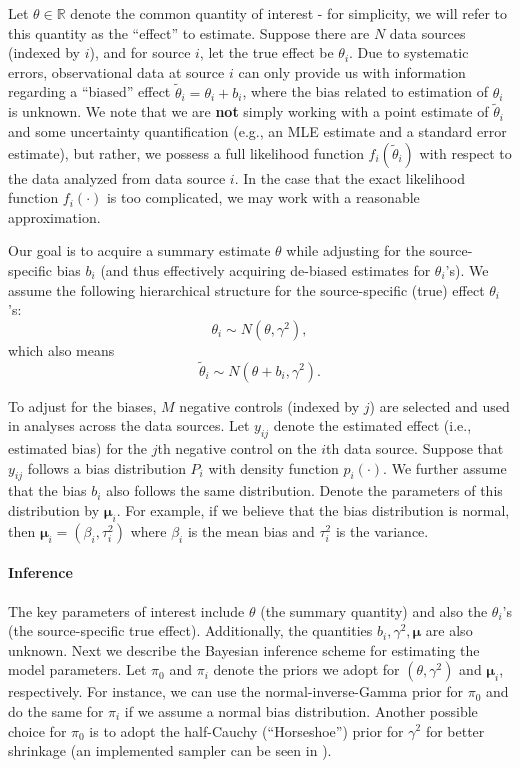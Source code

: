 \documentclass{article}
\begin{document}
Let $\theta \in \mathbb{R}$ denote the common quantity of interest - for simplicity, we will refer to this quantity as the ``effect'' to estimate.
Suppose there are $N$ data sources (indexed by $i$), and for source $i$, let the true effect be $\theta_i$.
Due to systematic errors, observational data at source $i$ can only provide us with information 
regarding a ``biased'' effect $\tilde{\theta}_i = \theta_i + b_i$, where the bias related to estimation of $\theta_i$ is unknown. 
We note that we are \textbf{not} simply working with a point estimate of $\tilde{\theta}_i $ and some uncertainty quantification (e.g., an MLE estimate and a standard error estimate), 
but rather, we possess a full likelihood function $f_i(\tilde{\theta}_i)$ with respect to the data analyzed from data source $i$. 
In the case that the exact likelihood function $f_i(\cdot)$ is too complicated, we may work with a reasonable approximation. 

Our goal is to acquire a summary estimate $\theta$
while adjusting for the source-specific bias $b_i$ (and thus effectively acquiring de-biased estimates for $\theta_i$'s).
We assume the following hierarchical structure for the source-specific (true) effect $\theta_i$'s:
\begin{equation}
\label{eq: theta_i-dist}
    \theta_i \sim N(\theta, \gamma^2),
\end{equation}
which also means
\begin{equation}
    \tilde\theta_i \sim N(\theta+b_i, \gamma^2).
\end{equation}

To adjust for the biases, $M$ negative controls (indexed by $j$) are selected and used in analyses across the data sources.
Let $y_{ij}$ denote the estimated effect (i.e., estimated bias) for the $j$th negative control on the $i$th data source. Suppose that $y_{ij}$ follows a bias distribution $P_i$ with density function $p_i(\cdot)$.
We further assume that the bias $b_i$ also follows the same distribution.
Denote the parameters of this distribution by $\boldsymbol\mu_i$.
For example, if we believe that the bias distribution is normal,
then $\boldsymbol\mu_i = (\beta_i, \tau_i^2)$ where $\beta_i$ is the mean bias and $\tau_i^2$ is the variance.


\paragraph{Inference}
The key parameters of interest include $\theta$ (the summary quantity) and also the $\theta_i$'s (the source-specific true effect).
Additionally, the quantities $b_i, \gamma^2, \boldsymbol\mu$ are also unknown.
Next we describe the Bayesian inference scheme for estimating the model parameters.
Let $\pi_0$ and $\pi_i$ denote the priors we adopt for $(\theta,\gamma^2)$ and $\boldsymbol\mu_i$, respectively.
For instance, we can use the normal-inverse-Gamma prior for $\pi_0$ and do the same for $\pi_i$ if we assume a normal bias distribution. Another possible choice for $\pi_0$ is to adopt the half-Cauchy (``Horseshoe'') prior for $\gamma^2$ for better shrinkage (an implemented sampler can be seen in \cite{nishimura2019regularization}). 
\end{document}
